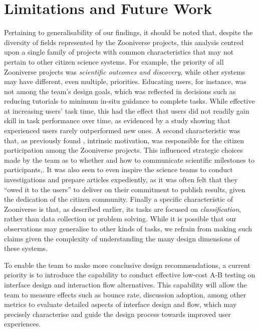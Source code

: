 \documentclass{sigchi}
\begin{document}
\section{Limitations and Future Work}
Pertaining to generalisability of our findings, it should be noted that, despite the diversity of fields represented by the Zooniverse projects, this analysis centred upon a single family of projects with common characteristics that may not pertain to other citizen science systems.  For example, the priority of all Zooniverse projects was \emph{scientific outcomes and discovery}, while other systems may have different, even multiple, priorities. Educating users, for instance, was not among the team's design goals, which was reflected in decisions such as reducing tutorials to minimum in-situ guidance to complete tasks.  While effective at increasing users' task time, this had the effect that users did not readily gain skill in task performance over time, as evidenced by a study showing that experienced users rarely outperformed new ones.  A second characteristic was that, as previously found \cite{raddick2010galaxy}, intrinsic motivation,  was responsible for the citizen participation among the Zooniverse projects.  This influenced strategic choices made by the team as to whether and how to communicate scientific milestones to participants,.  It was also seen to even inspire the science teams to conduct investigations and prepare articles expediently, as it was often felt that they ``owed it to the users'' to deliver on their commitment to publish results, given the dedication of the citizen community.  Finally a specific characteristic of Zooniverse is that, as described earlier, its tasks are focused on \emph{classification}, rather than data collection or problem solving.  While it is possible that our observations may generalise to other kinds of tasks, we refrain from making such claims given the complexity of understanding the many design dimensions of these systems.

To enable the team to make more conclusive design recommendations, a current priority is to introduce the capability to conduct effective low-cost A-B testing on interface design and interaction flow alternatives. This capability will allow the team to measure effects such as bounce rate, discussion adoption, among other metrics to evaluate detailed aspects of interface design and flow, which may precisely characterise and guide the design process towards improved user experiences.
\end{document}
